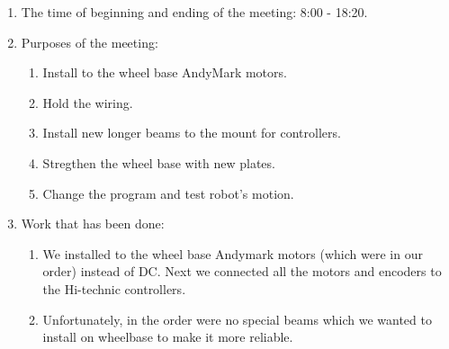 \begin{enumerate}
	
	\item The time of beginning and ending of the meeting: 8:00 - 18:20.
	
	\item Purposes of the meeting: 
	\begin{enumerate}
		
		\item Install to the wheel base AndyMark motors.
		
		\item Hold the wiring.
		
        \item Install new longer beams to the mount for controllers.
        
        \item Stregthen the wheel base with new plates.
        
        \item Change the program and test robot's motion.
		
	\end{enumerate}

	\item Work that has been done:
	\begin{enumerate}
		
		\item We installed to the wheel base Andymark motors (which were in our order) instead of DC. Next we connected all the motors and encoders to the Hi-technic controllers.
		
		\item Unfortunately, in the order were no special beams which we wanted to install on wheelbase to make it more reliable.
		\begin{figure}[H]
			\begin{minipage}[h]{0.2\linewidth}
				\center  
			\end{minipage}
			\begin{minipage}[h]{0.6\linewidth}
				\caption{}
			\end{minipage}
		\end{figure}
		

\end{enumerate}
\end{enumerate}
